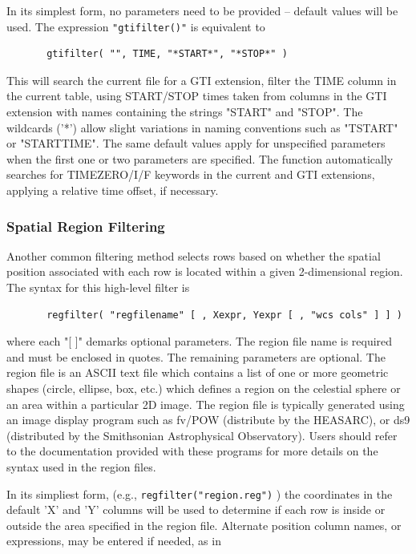 \documentclass[11pt]{article}
\begin{document}
    In  its  simplest form, no parameters need to be provided -- default
    values will be used.  The expression {\tt "gtifilter()"} is equivalent to

\begin{verbatim}
       gtifilter( "", TIME, "*START*", "*STOP*" )
\end{verbatim}
    This will search the current file for a GTI  extension,  filter  the
    TIME  column in the current table, using START/STOP times taken from
    columns in the GTI  extension  with  names  containing  the  strings
    "START"  and "STOP".  The wildcards ('*') allow slight variations in
    naming conventions  such  as  "TSTART"  or  "STARTTIME".   The  same
    default  values  apply for unspecified parameters when the first one
    or  two  parameters  are  specified.   The  function   automatically
    searches   for   TIMEZERO/I/F   keywords  in  the  current  and  GTI
    extensions, applying a relative time offset, if necessary.

\subsubsection{Spatial Region Filtering}

    Another common  filtering method selects rows based on whether the
    spatial position associated with each row is located within a given
    2-dimensional region.  The syntax for this high-level filter is

\begin{verbatim}
       regfilter( "regfilename" [ , Xexpr, Yexpr [ , "wcs cols" ] ] )
\end{verbatim}
    where each "[ ]" demarks optional parameters. The region file name
    is required and must be  enclosed in quotes.  The remaining
    parameters are optional.  The region file is an ASCII text file
    which contains a list of one or more geometric shapes (circle,
    ellipse, box, etc.) which defines a region on the celestial sphere
    or an area within a particular 2D image.  The region file is
    typically generated using an image display program such as fv/POW
    (distribute by the HEASARC), or ds9 (distributed by the Smithsonian
    Astrophysical Observatory).  Users should refer to the documentation
    provided with these programs for more details on the syntax used in
    the region files.

    In its simpliest form, (e.g., {\tt regfilter("region.reg")} ) the
    coordinates in the default 'X' and 'Y' columns will be used to
    determine if each row is inside or outside the area specified in
    the region file.  Alternate position column names, or expressions,
    may be entered if needed, as in
\end{document}
